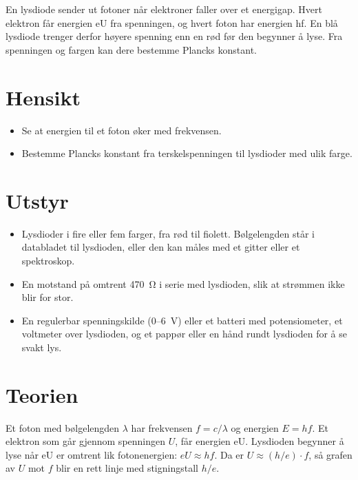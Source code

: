 \documentclass[11pt]{article}
\begin{document}

En lysdiode sender ut fotoner når elektroner faller over et energigap. Hvert elektron får energien eU fra spenningen, og hvert foton har energien hf. En blå lysdiode trenger derfor høyere spenning enn en rød før den begynner å lyse. Fra spenningen og fargen kan dere bestemme Plancks konstant.

\section*{Hensikt}

\begin{itemize}
\item Se at energien til et foton øker med frekvensen.
\item Bestemme Plancks konstant fra terskelspenningen til lysdioder med ulik farge.
\end{itemize}

\section*{Utstyr}

\begin{itemize}
\item Lysdioder i fire eller fem farger, fra rød til fiolett. Bølgelengden står i databladet til lysdioden, eller den kan måles med et gitter eller et spektroskop.
\item En motstand på omtrent 470~Ω i serie med lysdioden, slik at strømmen ikke blir for stor.
\item En regulerbar spenningskilde (0–6~V) eller et batteri med potensiometer, et voltmeter over lysdioden, og et pappør eller en hånd rundt lysdioden for å se svakt lys.
\end{itemize}

\section*{Teorien}

Et foton med bølgelengden $λ$ har frekvensen $f = c/λ$ og energien $E = hf$. Et elektron som går gjennom spenningen $U$, får energien eU. Lysdioden begynner å lyse når eU er omtrent lik fotonenergien: $eU \approx hf$. Da er $U \approx (h/e) \cdot f$, så grafen av $U$ mot $f$ blir en rett linje med stigningstall $h/e$.
\end{document}
